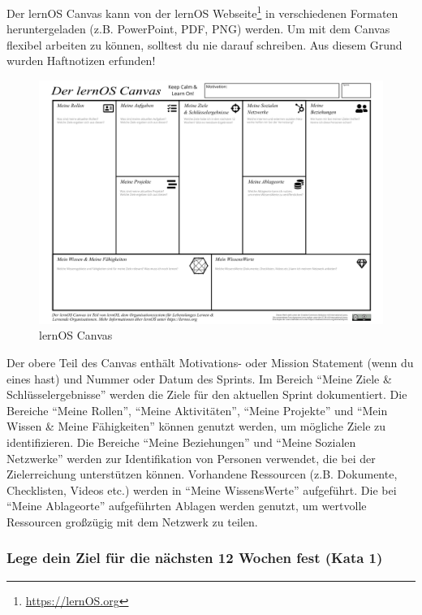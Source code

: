 \documentclass[
  ngerman,
  paper=a4,
,captions=tableheading
]{scrartcl}
\DeclareRobustCommand{\href}[2]{#2\footnote{\url{#1}}}
\begin{document}
Der lernOS Canvas kann von der \href{https://lernOS.org}{lernOS
Webseite} in verschiedenen Formaten heruntergeladen (z.B. PowerPoint,
PDF, PNG) werden. Um mit dem Canvas flexibel arbeiten zu können,
solltest du nie darauf schreiben. Aus diesem Grund wurden Haftnotizen
erfunden!

\begin{figure}
\centering
\includegraphics{./tex2pdf.-af94b87e0fdb9aa6/a706e42b1eb1c1bbbe80e1109cff3eb164666bfd.png}
\caption{lernOS Canvas}
\end{figure}

Der obere Teil des Canvas enthält Motivations- oder Mission Statement
(wenn du eines hast) und Nummer oder Datum des Sprints. Im Bereich
``Meine Ziele \& Schlüsselergebnisse'' werden die Ziele für den
aktuellen Sprint dokumentiert. Die Bereiche ``Meine Rollen'', ``Meine
Aktivitäten'', ``Meine Projekte'' und ``Mein Wissen \& Meine
Fähigkeiten'' können genutzt werden, um mögliche Ziele zu
identifizieren. Die Bereiche ``Meine Beziehungen'' und ``Meine Sozialen
Netzwerke'' werden zur Identifikation von Personen verwendet, die bei
der Zielerreichung unterstützen können. Vorhandene Ressourcen (z.B.
Dokumente, Checklisten, Videos etc.) werden in ``Meine WissensWerte''
aufgeführt. Die bei ``Meine Ablageorte'' aufgeführten Ablagen werden
genutzt, um wertvolle Ressourcen großzügig mit dem Netzwerk zu teilen.

\hypertarget{lege-dein-ziel-fuxfcr-die-nuxe4chsten-12-wochen-fest-kata-1}{%
\subsubsection{Lege dein Ziel für die nächsten 12 Wochen fest (Kata
1)}\label{lege-dein-ziel-fuxfcr-die-nuxe4chsten-12-wochen-fest-kata-1}}
\end{document}
